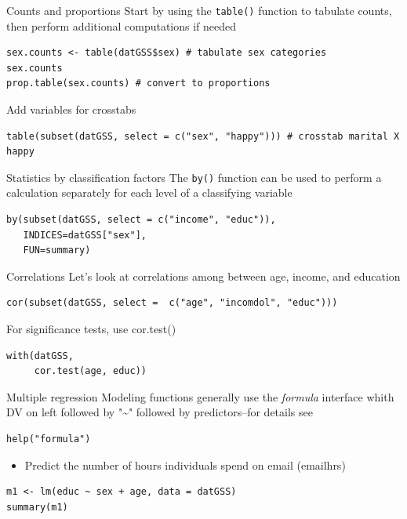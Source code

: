\documentclass[table,smaller]{beamer}
\begin{document}
\begin{frame}[fragile,label=sec-7-2]{Counts and proportions}
 Start by using the \verb~table()~ function to tabulate counts, then perform additional computations if needed
\begin{verbatim}
sex.counts <- table(datGSS$sex) # tabulate sex categories
sex.counts
prop.table(sex.counts) # convert to proportions
\end{verbatim}

Add variables for crosstabs

\begin{verbatim}
table(subset(datGSS, select = c("sex", "happy"))) # crosstab marital X happy
\end{verbatim}
\end{frame}



\begin{frame}[fragile,label=sec-7-3]{Statistics by classification factors}
 The \verb~by()~ function can be used to perform a calculation separately for each level of a classifying variable
\begin{verbatim}
by(subset(datGSS, select = c("income", "educ")),
   INDICES=datGSS["sex"],
   FUN=summary)
\end{verbatim}
\end{frame}

\begin{frame}[fragile,label=sec-7-4]{Correlations}
 Let's look at correlations among between age, income, and education
\begin{verbatim}
cor(subset(datGSS, select =  c("age", "incomdol", "educ")))
\end{verbatim}


For significance tests, use cor.test()
\begin{verbatim}
with(datGSS,
     cor.test(age, educ))
\end{verbatim}
\end{frame}

\begin{frame}[fragile,label=sec-7-5]{Multiple regression}
 Modeling functions generally use the \emph{formula} interface whith DV on left followed by "\textasciitilde{}" followed by predictors--for details see
\begin{verbatim}
help("formula")
\end{verbatim}

\begin{itemize}
\item Predict the number of hours individuals spend on email (emailhrs)
\end{itemize}
\begin{verbatim}
m1 <- lm(educ ~ sex + age, data = datGSS)
summary(m1)
\end{verbatim}
\end{frame}
\end{document}
